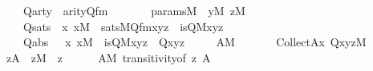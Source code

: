 \begin{isabellebody}
\ \ \ \ Qarty\ {\isacharcolon}{\kern0pt}\ {\isachardoublequoteopen}arity{\isacharparenleft}{\kern0pt}Q{\isacharunderscore}{\kern0pt}fm{\isacharparenright}{\kern0pt}\ {\isacharequal}{\kern0pt}\ {}{\isachardoublequoteclose}\ \isanewline
\ \ \ \ params{\isacharunderscore}{\kern0pt}M\ {\isacharcolon}{\kern0pt}\ {\isachardoublequoteopen}y{\isasymin}M{\isachardoublequoteclose}\ {\isachardoublequoteopen}z{\isasymin}M{\isachardoublequoteclose}\ \isanewline
\ \ \ \ Qsats\ {\isacharcolon}{\kern0pt}\ {\isachardoublequoteopen}{\isasymAnd}x{\isachardot}{\kern0pt}\ x{\isasymin}M\ {\isasymLongrightarrow}\ sats{\isacharparenleft}{\kern0pt}M{\isacharcomma}{\kern0pt}Q{\isacharunderscore}{\kern0pt}fm{\isacharcomma}{\kern0pt}{\isacharbrackleft}{\kern0pt}x{\isacharcomma}{\kern0pt}y{\isacharcomma}{\kern0pt}z{\isacharbrackright}{\kern0pt}{\isacharparenright}{\kern0pt}\ {\isasymlongleftrightarrow}\ is{\isacharunderscore}{\kern0pt}Q{\isacharparenleft}{\kern0pt}{\isacharhash}{\kern0pt}{\isacharhash}{\kern0pt}M{\isacharcomma}{\kern0pt}x{\isacharcomma}{\kern0pt}y{\isacharcomma}{\kern0pt}z{\isacharparenright}{\kern0pt}{\isachardoublequoteclose}\ \isanewline
\ \ \ \ Qabs\ \ {\isacharcolon}{\kern0pt}\ {\isachardoublequoteopen}{\isasymAnd}x{\isachardot}{\kern0pt}\ x{\isasymin}M\ {\isasymLongrightarrow}\ is{\isacharunderscore}{\kern0pt}Q{\isacharparenleft}{\kern0pt}{\isacharhash}{\kern0pt}{\isacharhash}{\kern0pt}M{\isacharcomma}{\kern0pt}x{\isacharcomma}{\kern0pt}y{\isacharcomma}{\kern0pt}z{\isacharparenright}{\kern0pt}\ {\isasymlongleftrightarrow}\ Q{\isacharparenleft}{\kern0pt}x{\isacharcomma}{\kern0pt}y{\isacharcomma}{\kern0pt}z{\isacharparenright}{\kern0pt}{\isachardoublequoteclose}\ \isanewline
\ \ \ \ {\isachardoublequoteopen}A{\isasymin}M{\isachardoublequoteclose}\isanewline
\ \ \isanewline
\ \ \ \ {\isachardoublequoteopen}Collect{\isacharparenleft}{\kern0pt}A{\isacharcomma}{\kern0pt}{\isasymlambda}x{\isachardot}{\kern0pt}\ Q{\isacharparenleft}{\kern0pt}x{\isacharcomma}{\kern0pt}y{\isacharcomma}{\kern0pt}z{\isacharparenright}{\kern0pt}{\isacharparenright}{\kern0pt}{\isasymin}M{\isachardoublequoteclose}\ \isanewline
%
\isadelimproof
%
\endisadelimproof
%
\isatagproof
{}\isamarkupfalse%
\ {\isacharminus}{\kern0pt}\isanewline
\ \ \isamarkupfalse%
\ {\isachardoublequoteopen}z{\isasymin}A\ {\isasymLongrightarrow}\ z{\isasymin}M{\isachardoublequoteclose}\ \ z\isanewline
\ \ \ \ \isamarkupfalse%
\ {\isacartoucheopen}A{\isasymin}M{\isacartoucheclose}\ transitivity{\isacharbrackleft}{\kern0pt}of\ z\ A{\isacharbrackright}{\kern0pt}\ \isamarkupfalse%

\end{isabellebody}

